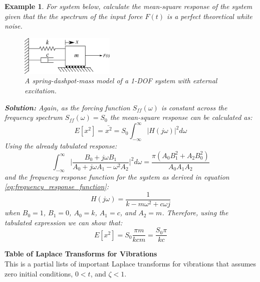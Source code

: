 \documentclass[12pt,letter]{article}
\newtheorem{ex}{Example}
\numberwithin{ex}{section} %
\newenvironment{example}{\begin{mdframed}[middlelinewidth=0.5mm]\begin{ex}\normalfont}{\end{ex}\end{mdframed}}
\numberwithin{re}{section} %
\begin{document}
\begin{example}
	For system below, calculate the mean-square response of the system given that the the spectrum of the input force $F(t)$ is a perfect theoretical white noise.
	\begin{figure}[H]
		\centering
		\includegraphics[width=0.4\textwidth]{../figures/forced_spring_mass_damper_system.png}
		\caption{A spring-dashpot-mass model of a 1-DOF system with external excitation.}
	\end{figure}
	\noindent\textbf{Solution:} Again, as the forcing function $S_{ff}(\omega)$ is constant across the frequency spectrum $S_{ff}(\omega)=S_0$ the mean-square response can be calculated as:
	\begin{equation}
		E[x^2] = \bar{x^2} =   S_{0} \int_{-\infty}^{\infty} |H(j\omega)|^2 d\omega
	\end{equation}
	Using the already tabulated response:
	\begin{equation}
		\int_{-\infty}^{\infty} \bigg|\frac{B_0 + j \omega B_1}{A_0+j \omega A_1 - \omega^2 A_2} \bigg|^2 d\omega = \frac{\pi (A_0 B_1^2 + A_2 B_0^2)}{A_0 A_1 A_2}
	\end{equation} 
	and the frequency response function for the system as derived in equation \ref{eq:frequency_response_function}:
	\begin{equation}
		H(j\omega) = \frac{1}{k-m\omega^2+c\omega j}
	\end{equation}
	when $B_0=1$, $B_1 = 0$, $A_0=k$, $A_1=c$, and $A_2 =m$. Therefore, using the tabulated expression we can show that:
	\begin{equation}
		E[x^2] = S_0 \frac{\pi m }{k c m} =  \frac{S_0 \pi}{k c}
	\end{equation} 
\end{example}			
			
\pagebreak			
			\pagestyle{empty}
			\vspace{-25ex}
			\begin{center}
			{\large{}\textbf{Table of Laplace Transforms for Vibrations}} \\
			\normalsize{} This is a partial lists of important Laplace transforms for vibrations that assumes \\ zero initial conditions, $0 < t$, and $\zeta < 1$.
			\end{center}
			
\end{document}
